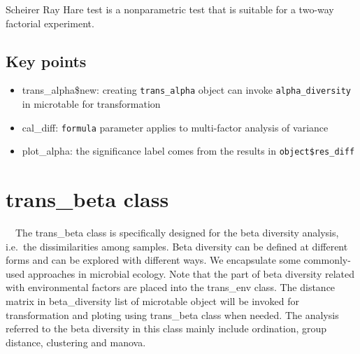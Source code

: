 \documentclass[
]{book}
\newenvironment{Shaded}{\begin{snugshade}}{\end{snugshade}}
\newcommand{\AttributeTok}[1]{\textcolor[rgb]{0.77,0.63,0.00}{#1}}
\newcommand{\CommentTok}[1]{\textcolor[rgb]{0.56,0.35,0.01}{\textit{#1}}}
\newcommand{\FunctionTok}[1]{\textcolor[rgb]{0.00,0.00,0.00}{#1}}
\newcommand{\NormalTok}[1]{#1}
\newcommand{\SpecialCharTok}[1]{\textcolor[rgb]{0.00,0.00,0.00}{#1}}
\newcommand{\StringTok}[1]{\textcolor[rgb]{0.31,0.60,0.02}{#1}}
\providecommand{\tightlist}{%
  \setlength{\itemsep}{0pt}\setlength{\parskip}{0pt}}
\begin{document}
Scheirer Ray Hare test is a nonparametric test that is suitable for a two-way factorial experiment.

\begin{Shaded}
\end{Shaded}

\hypertarget{key-points-3}{%
\subsection{Key points}\label{key-points-3}}

\begin{itemize}
\tightlist
\item
  trans\_alpha\$new: creating \texttt{trans\_alpha} object can invoke \texttt{alpha\_diversity} in microtable for transformation
\item
  cal\_diff: \texttt{formula} parameter applies to multi-factor analysis of variance
\item
  plot\_alpha: the significance label comes from the results in \texttt{object\$res\_diff}
\end{itemize}

\hypertarget{trans_beta-class}{%
\section{trans\_beta class}\label{trans_beta-class}}

　The trans\_beta class is specifically designed for the beta diversity analysis, i.e.~the dissimilarities among samples.
Beta diversity can be defined at different forms\citep{Tuomisto_diversity_2010} and can be explored with different ways\citep{Anderson_Navigating_2011}.
We encapsulate some commonly-used approaches in microbial ecology\citep{Ramette_Multivariate_2007}.
Note that the part of beta diversity related with environmental factors are placed into the trans\_env class.
The distance matrix in beta\_diversity list of microtable object will be invoked for transformation and ploting using trans\_beta class when needed.
The analysis referred to the beta diversity in this class mainly include ordination, group distance, clustering and manova.
\end{document}

